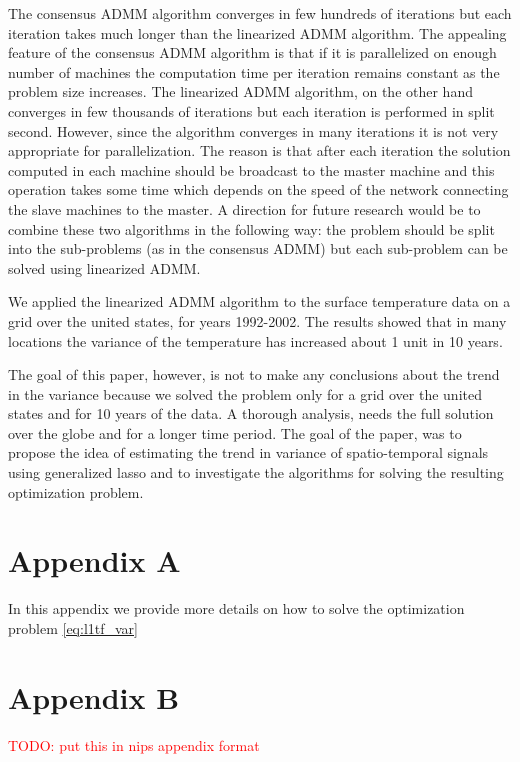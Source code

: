 \documentclass{article}
\newcommand{\attn}[1]{\textcolor{red}{TODO: #1}}
\begin{document}
The consensus ADMM algorithm converges in few hundreds of iterations
but each iteration takes much longer than the linearized ADMM
algorithm. The appealing feature of the consensus ADMM algorithm is
that if it is parallelized on enough number of machines the
computation time per iteration remains constant as the problem size
increases. The linearized ADMM algorithm, on the other hand converges
in few thousands of iterations but each iteration is performed in
split second. However, since the algorithm converges in many
iterations it is not very appropriate for parallelization. The reason
is that after each iteration the solution computed in each machine
should be broadcast to the master machine and this operation takes
some time which depends on the speed of the network connecting the
slave machines to the master. A direction for future research would be
to combine these two algorithms in the following way: the problem
should be split into the sub-problems (as in the consensus ADMM) but
each sub-problem can be solved using linearized ADMM. 

We applied the linearized ADMM algorithm to the surface temperature
data on a grid over the united states, for years 1992-2002. The
results showed that in many locations the variance of the temperature
has increased about 1 unit in 10 years. 

The goal of this paper, however, is not to make any conclusions about
the trend in the variance because we solved the problem only for a
grid over the united states and for 10 years of the data. A thorough
analysis, needs the full solution over the globe and for a longer time
period. The goal of the paper, was to propose the idea of estimating
the trend in variance of spatio-temporal signals using generalized
lasso and to investigate the algorithms for solving the resulting
optimization problem. 

\section{Appendix A}
\label{sec:app_l1tf_var}

In this appendix we provide more details on how to solve the optimization problem \ref{eq:l1tf_var}


\section{Appendix B}
\label{sec:app_consADMM}
\attn{put this in nips appendix format}
\end{document}

